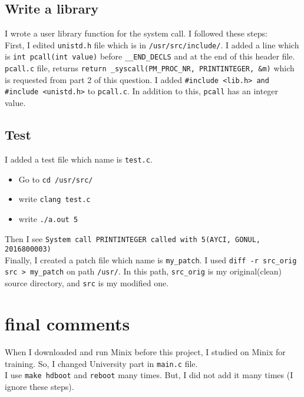 \documentclass[paper=a4, fontsize=11pt]{scrartcl}
\numberwithin{equation}{section}		%
\numberwithin{figure}{section}			%
\numberwithin{table}{section}				%
\begin{document}
\subsection{Write a library}
I wrote a user library function for the system call. I followed these steps:
\\

First, I edited \texttt{unistd.h} file which is in \texttt{/usr/src/include/}. I added a line which is \texttt{int pcall(int value)} before \texttt{\_\_END\_DECLS} and at the end of this header file.
\\
\texttt{pcall.c} file, returns \texttt{return \_syscall(PM\_PROC\_NR, PRINTINTEGER, \&m)} which is requested from part 2 of this question. I added \texttt{#include <lib.h> and #include <unistd.h>} to \texttt{pcall.c}. In addition to this, \texttt{pcall} has an integer value. 

\subsection{Test}
I added a test file which name is \texttt{test.c}. 
\\

\begin{itemize}
	\item Go to \texttt{cd /usr/src/} 
	\item write \texttt{clang test.c}
	\item write \texttt{./a.out 5}
\end{itemize}

Then I see \texttt{System call PRINTINTEGER called with 5(AYCI, GONUL, 2016800003)}
\\

Finally, I created a patch file which name is \texttt{my\_patch}.
I used \texttt{diff -r src\_orig src > my\_patch} on path \texttt{/usr/}. In this path, \texttt{src\_orig} is my original(clean) source directory, and \texttt{src} is my modified one. 

\section{final comments}
When I downloaded and run Minix before this project, I studied on Minix for training. So, I changed University part in \texttt{main.c} file. 
\\

I use \texttt{make hdboot} and \texttt{reboot} many times. But, I did not add it many times (I ignore these steps).
\end{document}
